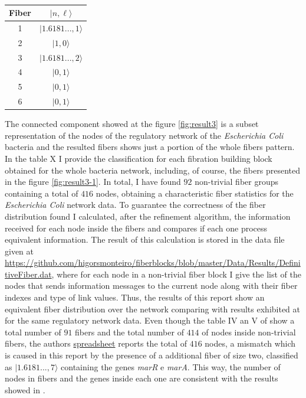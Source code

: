 \documentclass[12pt]{diazessay} %
\begin{document}
\begin{table}[H]
\centering
\begin{tabular}[b]{cc}\hline
	Fiber & $| n, \ell \rangle$  \\ \hline
	1 & $| 1.6181..., 1 \rangle$ \\
	2 & $| 1, 0 \rangle$ \\
	3 & $| 1.6181..., 2 \rangle$ \\ 
	4 & $| 0, 1 \rangle$ \\
	5 & $| 0, 1 \rangle$ \\
	6 & $| 0, 1 \rangle$ \\ \hline
  \end{tabular}
  \caption{}
  \label{tab:r2}
\end{table}

The connected component showed at the figure \ref{fig:result3} is a subset representation of the nodes of the regulatory network of the \textit{Escherichia Coli} bacteria and the resulted fibers shows just a portion of the whole fibers pattern. In the table X I provide the classification for each fibration building block obtained for the whole bacteria network, including, of course, the fibers presented in the figure \ref{fig:result3-1}. In total, I have found $92$ non-trivial fiber groups containing a total of $416$ nodes, obtaining a characteristic fiber statistics for the \textit{Escherichia Coli} network data. To guarantee the correctness of the fiber distribution found I calculated, after the refinement algorithm, the information received for each node inside the fibers and compares if each one process equivalent information. The result of this calculation is stored in the data file given at \url{https://github.com/higorsmonteiro/fiberblocks/blob/master/Data/Results/DefinitiveFiber.dat}, where for each node in a non-trivial fiber block I give the list of the nodes that sends information messages to the current node along with their fiber indexes and type of link values. Thus, the results of this report show an equivalent fiber distribution over the network comparing with results exhibited at \cite{fibration2019} for the same regulatory network data. Even though the table IV an V of \cite{fibration2019} show a total number of $91$ fibers and the total number of $414$ of nodes inside non-trivial fibers, the authors \href{https://docs.google.com/spreadsheets/d/1-RG5vR_EGNPqQcnJU8q3ky1OpWi3OjTh5Uo-Xa0PjOc/edit#gid=1973910256}{spreadsheet} reports the total of $416$ nodes, a mismatch which is caused in this report by the presence of a additional fiber of size two, classified as $| 1.6181..., 7 \rangle$ containing the genes \textit{marR} e \textit{marA}. This way, the number of nodes in fibers and the genes inside each one are consistent with the results showed in \cite{fibration2019}.
\end{document}
